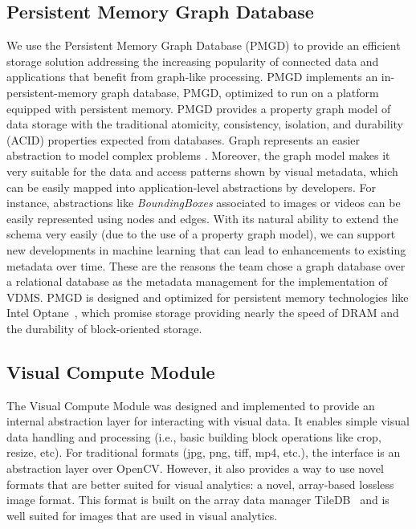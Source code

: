\subsection{Persistent Memory Graph Database}

We use the Persistent Memory Graph Database (PMGD) to provide an efficient storage
solution addressing the increasing popularity of connected data and
applications that benefit from graph-like processing. 
PMGD implements an in-persistent-memory graph database, PMGD, optimized
to run on a platform equipped with persistent memory.
PMGD provides a property graph model of data storage with the traditional
atomicity, consistency, isolation, and durability 
(ACID) properties expected from databases. 
Graph represents an easier abstraction to model complex problems \cite{tao}.
Moreover, the graph model makes it very suitable for the data and
access patterns shown by visual metadata, which can be easily mapped 
into application-level abstractions by developers. 
For instance, abstractions like \textit{BoundingBoxes} associated to 
images or videos can be easily represented using nodes and edges.
With its natural ability to extend the schema very
easily (due to the use of a property graph model),
we can support new developments in machine learning that can lead to
enhancements to existing metadata over time.
These are the reasons the team chose a graph database over a
relational database as the metadata management for the implementation of VDMS.
PMGD is designed and optimized for persistent memory technologies
like Intel Optane~\cite{IntelXPoint15}, which
promise storage providing nearly the speed of DRAM and the
durability of block-oriented storage.

\subsection{Visual Compute Module} 

The Visual Compute Module was designed and implemented to provide
an internal abstraction layer for interacting with visual data.
It enables simple visual data handling and processing (i.e., basic building block 
operations like crop, resize, etc).
For traditional formats (jpg, png, tiff, mp4, etc.),
the interface is an abstraction layer over OpenCV.
However, it also provides a way to use novel formats that are 
better suited for visual analytics: a novel, array-based lossless image format. 
This format is built on the array data manager TileDB~\cite{TileDB} and 
is well suited for images that are used in visual analytics.

